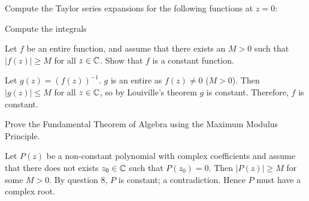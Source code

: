 
\setcounter{question}{1}
\question Compute the Taylor series expansions for the following
functions at $z = 0$:

\question Compute the integrals

\setcounter{question}{7}
\question Let $f$ be an entire function, and assume that
there exists an $M > 0$ such that $\lvert f(z) \rvert \geq M$
for all $z \in \mathbb{C}$.
Show that $f$ is a constant function.
\begin{solution}
    Let $g(z) = (f(z))^{-1}$.
    $g$ is an entire as $f(z) \neq 0$ ($M > 0$).
    Then $\lvert g(z) \rvert \leq M$ for all $z \in \mathbb{C}$,
    so by Louiville's theorem $g$ is constant.
    Therefore, $f$ is constant.
\end{solution}

\setcounter{question}{9}
\question Prove the Fundamental Theorem of Algebra using the Maximum Modulus Principle.
\begin{solution}
    Let $P(z)$ be a non-constant polynomial with complex coefficients and
    assume that there does not exists $z_0 \in \mathbb{C}$ such that $P(z_0) = 0$.
    Then $\lvert P(z) \rvert \geq M$ for some $M > 0$.
    By question $8$, $P$ is constant; a contradiction.
    Hence $P$ must have a complex root.
\end{solution}
